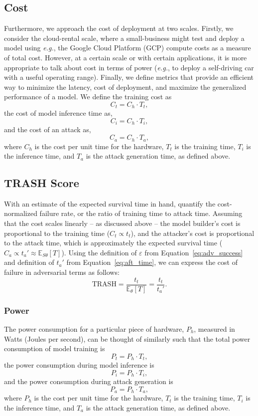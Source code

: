 \documentclass[sn-mathphys-num]{sn-jnl}%
\begin{document}
\subsection{Cost}

Furthermore, we approach the cost of deployment at two scales. Firstly, we consider the cloud-rental scale, where a small-business might test and deploy a model using \textit{e.g.}, the Google Cloud Platform (GCP) compute costs as a measure of total cost. However, at a certain scale or with certain applications, it is  more appropriate to talk about cost in terms of power (\textit{e.g.}, to deploy a self-driving car with a useful operating range). Finally, we define metrics that provide an efficient way to minimize the latency, cost of deployment, and 
maximize the generalized performance of a model. We define the training cost as
$$
    C_t = C_h \cdot T_t,
$$
the cost of model inference time as,
$$
    C_i = C_h \cdot T_i,
$$
and the cost of an attack as,
$$
    C_a = C_h \cdot T_a,
$$
where $C_h$ is the cost per unit time for the hardware, $T_t$ is the training time, $T_i$ is the inference time, and $T_a$ is the attack generation time, as defined above.

\subsection{TRASH Score}
With an estimate of the expected survival time in hand,  quantify the cost-normalized failure rate, or the ratio of training time to attack time. Assuming that the cost scales linearly -- as discussed above -- the model builder's cost is proportional to the training time ($C_t \propto t_{t}$), and the attacker's cost is proportional to the attack time, which is approximately the expected survival time ($C_{a} \propto t_{a}' \approx \mathbb{E}_{S\theta}[T]$). Using the definition of $\varepsilon$ from Equation~\ref{eq:adv_success} and definition of $t_a'$ from Equation~\ref{eq:aft_time}, we can express the cost of failure in adversarial terms as follows:
\begin{equation}
	\textrm{TRASH}=\frac{t_t}{\mathbb{E}_{\theta}[T]} = \frac{t_t}{t_a'}.
	\label{eq:cost}
\end{equation}

\subsubsection{Power}

The power consumption for a particular piece of hardware, $P_h$, measured in Watts (Joules per second), can be thought of similarly such that the total power consumption of model training is
$$
    P_t = P_h \cdot T_t,
    \label{eq:power_training}
$$
the power consumption during model inference is
$$
    P_i = P_h \cdot T_i,
    \label{eq:power_inference}
$$
and the power consumption during attack generation is
$$
    P_a = P_h \cdot T_a,
    \label{eq:power_attack}
$$
where $P_h$ is the cost per unit time for the hardware, $T_t$ is the training time, $T_i$ is the inference time, and $T_a$ is the attack generation time, as defined above.
\end{document}
